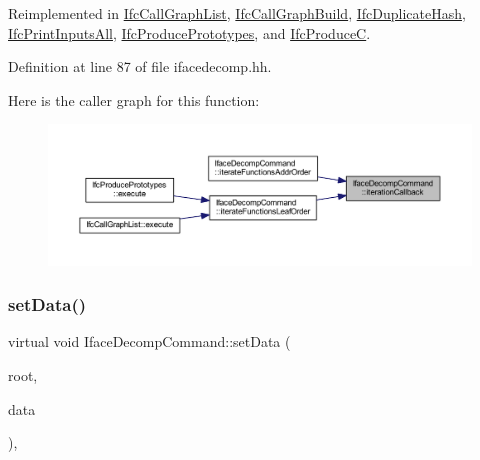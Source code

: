 Reimplemented in \mbox{\hyperlink{class_ifc_call_graph_list_aa7250e67ebde654dd6792caf88186f6c}{Ifc\+Call\+Graph\+List}}, \mbox{\hyperlink{class_ifc_call_graph_build_a141d9fa5d5f44124c3baadd825a7d658}{Ifc\+Call\+Graph\+Build}}, \mbox{\hyperlink{class_ifc_duplicate_hash_a5459747ed3d0b946f717556fd9e40c08}{Ifc\+Duplicate\+Hash}}, \mbox{\hyperlink{class_ifc_print_inputs_all_af1ed619938898b1dd91be98c256a7512}{Ifc\+Print\+Inputs\+All}}, \mbox{\hyperlink{class_ifc_produce_prototypes_abff378a291a5e7dd0c24d8ced5c9c4ea}{Ifc\+Produce\+Prototypes}}, and \mbox{\hyperlink{class_ifc_produce_c_ae7aa419deb8e0f730e574b40ac69b2d7}{Ifc\+ProduceC}}.



Definition at line 87 of file ifacedecomp.\+hh.

Here is the caller graph for this function\+:
\nopagebreak
\begin{figure}[H]
\begin{center}
\leavevmode
\includegraphics[width=350pt]{class_iface_decomp_command_a619d9358a4e77bef66a26f02ea7a6c8e_icgraph}
\end{center}
\end{figure}
\mbox{\label{class_iface_decomp_command_ad9bcf72bbdc7faddd7a23a1a4d127b0c}} 
\subsubsection{\texorpdfstring{setData()}{setData()}}
{\footnotesize\ttfamily virtual void Iface\+Decomp\+Command\+::set\+Data (\begin{DoxyParamCaption}\item[{\mbox{\hyperlink{class_iface_status}{Iface\+Status}} $\ast$}]{root,  }\item[{\mbox{\hyperlink{class_iface_data}{Iface\+Data}} $\ast$}]{data }\end{DoxyParamCaption})\hspace{0.3cm}{\ttfamily [inline]}, {\ttfamily [virtual]}}



